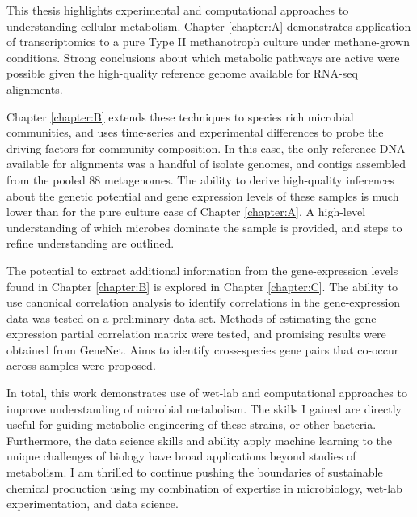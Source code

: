 This thesis highlights experimental and computational approaches to understanding cellular metabolism.
Chapter \ref{chapter:A} demonstrates application of transcriptomics to a pure Type II methanotroph culture under methane-grown conditions.
Strong conclusions about which metabolic pathways are active were possible given the high-quality reference genome available for RNA-seq alignments.

Chapter \ref{chapter:B} extends these techniques to species rich microbial communities, and uses time-series and experimental differences to probe the driving factors for community composition.
In this case, the only reference DNA available for alignments was a handful of isolate genomes, and contigs assembled from the pooled 88 metagenomes.
The ability to derive high-quality inferences about the genetic potential and gene expression levels of these samples is much lower than for the pure culture case of Chapter \ref{chapter:A}.
A high-level understanding of which microbes dominate the sample is provided, and steps to refine understanding are outlined.

The potential to extract additional information from the gene-expression levels found in Chapter \ref{chapter:B} is explored in Chapter \ref{chapter:C}.
The ability to use canonical correlation analysis to identify correlations in the gene-expression data was tested on a preliminary data set.
Methods of estimating the gene-expression partial correlation matrix were tested, and promising results were obtained from GeneNet.
Aims to identify cross-species gene pairs that co-occur across samples were proposed.

In total, this work demonstrates use of wet-lab and computational approaches to improve understanding of microbial metabolism.
The skills I gained are directly useful for guiding metabolic engineering of these strains, or other bacteria.
Furthermore, the data science skills and ability apply machine learning to the unique challenges of biology have broad applications beyond studies of metabolism.
I am thrilled to continue pushing the boundaries of sustainable chemical production using my combination of expertise in microbiology, wet-lab experimentation, and data science.

